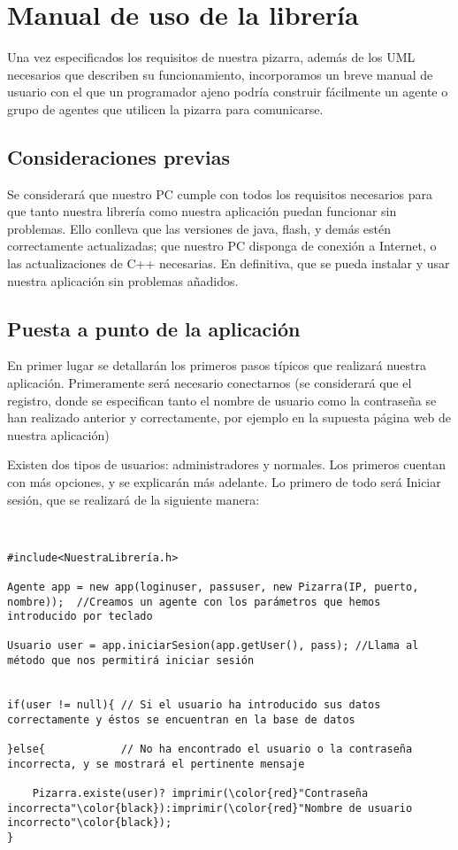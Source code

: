 \chapter{Manual de uso de la librería}
Una vez especificados los requisitos de nuestra pizarra, además de los UML necesarios que describen su funcionamiento, incorporamos un breve manual de usuario con el que un programador ajeno podría construir fácilmente un agente o grupo de agentes que utilicen la pizarra para comunicarse.
\section{Consideraciones previas}
Se considerará que nuestro PC cumple con todos los requisitos necesarios para que tanto nuestra librería como nuestra aplicación puedan funcionar sin problemas. Ello conlleva que las versiones de java, flash, y demás estén correctamente actualizadas; que nuestro PC disponga de conexión a Internet, o las actualizaciones de C++ necesarias. En definitiva, que se pueda instalar y usar nuestra aplicación sin problemas añadidos.
\section{Puesta a punto de la aplicación}
En primer lugar se detallarán los primeros pasos típicos que realizará nuestra aplicación. Primeramente será necesario conectarnos (se considerará que el registro, donde se especifican tanto el nombre de usuario como la contraseña se han realizado anterior y correctamente, por ejemplo en la supuesta página web de nuestra aplicación) 

Existen dos tipos de usuarios: administradores y normales. Los primeros cuentan con más opciones, y se explicarán más adelante. Lo primero de todo será Iniciar sesión, que se realizará de la siguiente manera:
\begin{verbatim}


#include<NuestraLibrería.h>

Agente app = new app(loginuser, passuser, new Pizarra(IP, puerto, nombre));  //Creamos un agente con los parámetros que hemos introducido por teclado

Usuario user = app.iniciarSesion(app.getUser(), pass); //Llama al método que nos permitirá iniciar sesión


if(user != null){ // Si el usuario ha introducido sus datos correctamente y éstos se encuentran en la base de datos

}else{            // No ha encontrado el usuario o la contraseña incorrecta, y se mostrará el pertinente mensaje 

    Pizarra.existe(user)? imprimir(\color{red}"Contraseña incorrecta"\color{black}):imprimir(\color{red}"Nombre de usuario incorrecto"\color{black});
}
\end{verbatim}

